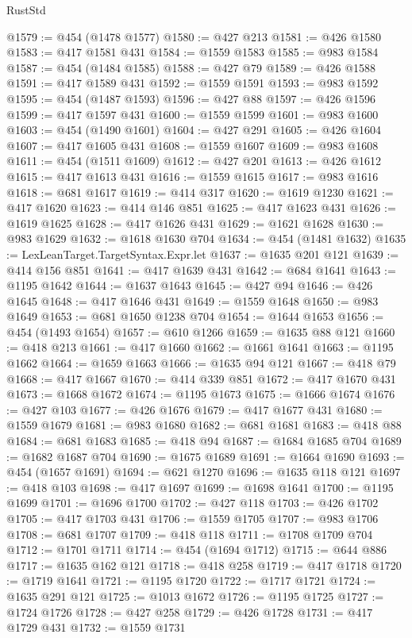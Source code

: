 \begin{lexlean}{RustStd}
\begin{coremodule}
{\begin{coremodule}
{{{{{{{{{{{{{{{{{{{{{{{{{{{{{{{{@1579 := @454 (@1478 @1577)
@1580 := @427 @213
@1581 := @426 @1580
@1583 := @417 @1581 @431
@1584 := @1559 @1583
@1585 := @983 @1584
@1587 := @454 (@1484 @1585)
@1588 := @427 @79
@1589 := @426 @1588
@1591 := @417 @1589 @431
@1592 := @1559 @1591
@1593 := @983 @1592
@1595 := @454 (@1487 @1593)
@1596 := @427 @88
@1597 := @426 @1596
@1599 := @417 @1597 @431
@1600 := @1559 @1599
@1601 := @983 @1600
@1603 := @454 (@1490 @1601)
@1604 := @427 @291
@1605 := @426 @1604
@1607 := @417 @1605 @431
@1608 := @1559 @1607
@1609 := @983 @1608
@1611 := @454 (@1511 @1609)
@1612 := @427 @201
@1613 := @426 @1612
@1615 := @417 @1613 @431
@1616 := @1559 @1615
@1617 := @983 @1616
@1618 := @681 @1617
@1619 := @414 @317
@1620 := @1619 @1230
@1621 := @417 @1620
@1623 := @414 @146 @851
@1625 := @417 @1623 @431
@1626 := @1619 @1625
@1628 := @417 @1626 @431
@1629 := @1621 @1628
@1630 := @983 @1629
@1632 := @1618 @1630 @704
@1634 := @454 (@1481 @1632)
@1635 := LexLeanTarget.TargetSyntax.Expr.let
@1637 := @1635 @201 @121
@1639 := @414 @156 @851
@1641 := @417 @1639 @431
@1642 := @684 @1641
@1643 := @1195 @1642
@1644 := @1637 @1643
@1645 := @427 @94
@1646 := @426 @1645
@1648 := @417 @1646 @431
@1649 := @1559 @1648
@1650 := @983 @1649
@1653 := @681 @1650 @1238 @704
@1654 := @1644 @1653
@1656 := @454 (@1493 @1654)
@1657 := @610 @1266
@1659 := @1635 @88 @121
@1660 := @418 @213
@1661 := @417 @1660
@1662 := @1661 @1641
@1663 := @1195 @1662
@1664 := @1659 @1663
@1666 := @1635 @94 @121
@1667 := @418 @79
@1668 := @417 @1667
@1670 := @414 @339 @851
@1672 := @417 @1670 @431
@1673 := @1668 @1672
@1674 := @1195 @1673
@1675 := @1666 @1674
@1676 := @427 @103
@1677 := @426 @1676
@1679 := @417 @1677 @431
@1680 := @1559 @1679
@1681 := @983 @1680
@1682 := @681 @1681
@1683 := @418 @88
@1684 := @681 @1683
@1685 := @418 @94
@1687 := @1684 @1685 @704
@1689 := @1682 @1687 @704
@1690 := @1675 @1689
@1691 := @1664 @1690
@1693 := @454 (@1657 @1691)
@1694 := @621 @1270
@1696 := @1635 @118 @121
@1697 := @418 @103
@1698 := @417 @1697
@1699 := @1698 @1641
@1700 := @1195 @1699
@1701 := @1696 @1700
@1702 := @427 @118
@1703 := @426 @1702
@1705 := @417 @1703 @431
@1706 := @1559 @1705
@1707 := @983 @1706
@1708 := @681 @1707
@1709 := @418 @118
@1711 := @1708 @1709 @704
@1712 := @1701 @1711
@1714 := @454 (@1694 @1712)
@1715 := @644 @886
@1717 := @1635 @162 @121
@1718 := @418 @258
@1719 := @417 @1718
@1720 := @1719 @1641
@1721 := @1195 @1720
@1722 := @1717 @1721
@1724 := @1635 @291 @121
@1725 := @1013 @1672
@1726 := @1195 @1725
@1727 := @1724 @1726
@1728 := @427 @258
@1729 := @426 @1728
@1731 := @417 @1729 @431
@1732 := @1559 @1731
}}}}}}}}}}}}}}}}}}}}}}}}}}}}}}}}
\end{coremodule}}
\end{coremodule}
\end{lexlean}
